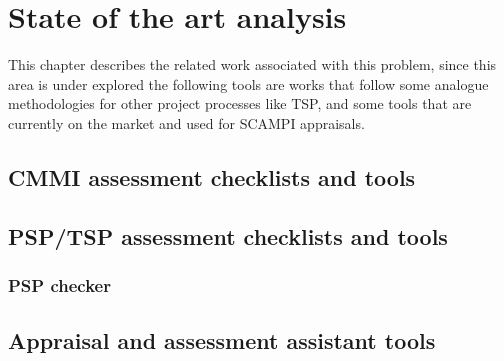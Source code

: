 \chapter{State of the art analysis}\label{chap:chap3}

This chapter describes the related work associated with this problem, since this area is under explored the following tools are works that follow some analogue methodologies for other project processes like TSP, and some tools that are currently on the market and used for SCAMPI appraisals.

\section{CMMI assessment checklists and tools}


\section{PSP/TSP assessment checklists and tools}
\subsection{PSP checker}

\section{Appraisal and assessment assistant tools}